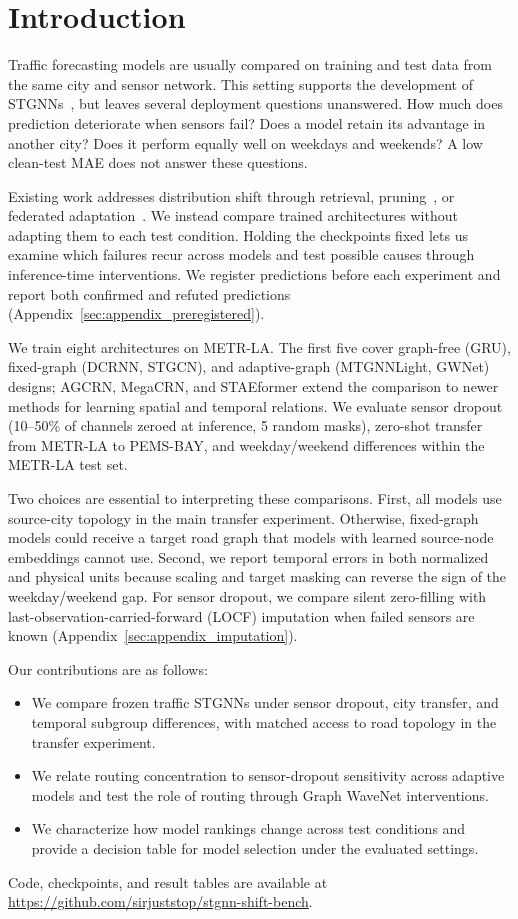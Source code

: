 \section{Introduction}
\label{sec:intro}

Traffic forecasting models are usually compared on training and test data from
the same city and sensor network. This setting supports the development of
STGNNs~\citep{li2018dcrnn,wu2019gwnet,yu2018stgcn}, but leaves several
deployment questions unanswered. How much does prediction deteriorate when
sensors fail? Does a model retain its advantage in another city? Does it
perform equally well on weekdays and weekends? A low clean-test MAE does not
answer these questions.

Existing work addresses distribution shift through retrieval,
pruning~\citep{zhang2025strap,jing2026tlgpstgn}, or federated
adaptation~\citep{zeng2025fedtt}. We instead compare trained architectures
without adapting them to each test condition. Holding the checkpoints fixed
lets us examine which failures recur across models and test possible causes
through inference-time interventions. We register predictions before each
experiment and report both confirmed and refuted predictions
(Appendix~\ref{sec:appendix_preregistered}).

We train eight architectures on METR-LA. The first five cover graph-free
(GRU), fixed-graph (DCRNN, STGCN), and adaptive-graph (MTGNNLight, GWNet)
designs; AGCRN, MegaCRN, and STAEformer extend the comparison to newer
methods for learning spatial and temporal relations. We evaluate sensor
dropout (10--50\% of channels zeroed at inference, 5 random masks), zero-shot
transfer from METR-LA to PEMS-BAY, and weekday/weekend differences within
the METR-LA test set.

Two choices are essential to interpreting these comparisons. First, all
models use source-city topology in the main transfer experiment. Otherwise,
fixed-graph models could receive a target road graph that models with learned
source-node embeddings cannot use. Second, we report temporal errors in
both normalized and physical units because scaling and target masking can
reverse the sign of the weekday/weekend gap. For sensor dropout, we compare
silent zero-filling with last-observation-carried-forward (LOCF) imputation
when failed sensors are known (Appendix~\ref{sec:appendix_imputation}).

Our contributions are as follows:
\begin{itemize}
  \item We compare frozen traffic STGNNs under sensor dropout, city transfer,
        and temporal subgroup differences, with matched access to road
        topology in the transfer experiment.
  \item We relate routing concentration to sensor-dropout sensitivity across
        adaptive models and test the role of routing through Graph WaveNet
        interventions.
  \item We characterize how model rankings change across test conditions and
        provide a decision table for model selection under the evaluated settings.
\end{itemize}

Code, checkpoints, and result tables are available at
\url{https://github.com/sirjuststop/stgnn-shift-bench}.
